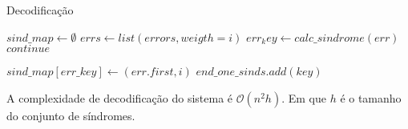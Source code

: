 \begin{algorithm}
	\caption{Decodificação}\label{alg:update_sindromes}
	\begin{algorithmic}[Message]
		\State $sind\_map \gets \emptyset$
			\State $errs \gets list(errors, weigth=i)$
				\State $err_key \gets calc\_sindrome(err)$
					\State $continue$
				\EndIf
				
				\State $sind\_map[err\_key] \gets (err.first, i)$
				\EndIf
			\EndFor
		\EndFor
				\State $end\_one\_sinds.add(key)$
			\EndIf
		\EndFor
		\EndProcedure
	\end{algorithmic}
\end{algorithm}

A complexidade de decodificação do sistema é  $\mathcal{O}(n^2h)$. Em que $h$ é o tamanho do conjunto de síndromes. 